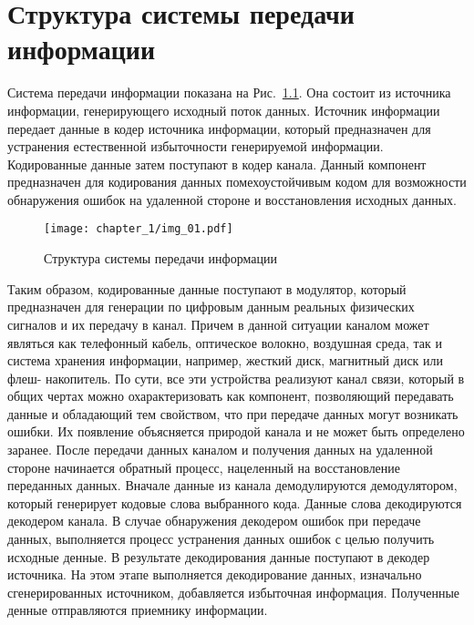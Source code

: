 \chapter{Структура системы передачи информации}

Система передачи информации показана на Рис.~\ref{img_01}. Она состоит из источника информации, генерирующего исходный 
поток данных. Источник информации передает данные в кодер источника информации, который предназначен для устранения 
естественной избыточности генерируемой информации. Кодированные данные затем поступают в кодер канала. Данный 
компонент предназначен для кодирования данных помехоустойчивым кодом для возможности обнаружения ошибок на удаленной 
стороне и восстановления исходных данных.

\begin{figure}[htbp]
\begin{center}
\texttt{[image: chapter\_1/img\_01.pdf]}
\end{center}
\caption{Структура системы передачи информации}
\label{img_01}
\end{figure}

Таким образом, кодированные данные поступают в модулятор, который предназначен для генерации по цифровым данным реальных физических сигналов и их передачу в канал. Причем в данной ситуации каналом может являться как телефонный кабель, оптическое волокно, воздушная среда, так и система хранения информации, например, жесткий диск, магнитный диск или флеш- накопитель. По сути, все эти устройства реализуют канал связи, который в общих чертах можно охарактеризовать как компонент, позволяющий передавать данные и обладающий тем свойством, что при передаче данных могут возникать ошибки. Их появление объясняется природой канала и не может быть определено заранее. После передачи данных каналом и получения данных на удаленной стороне начинается обратный процесс, нацеленный на восстановление переданных данных. Вначале данные из канала демодулируются демодулятором, который генерирует кодовые слова выбранного кода. Данные слова декодируются декодером канала. В случае обнаружения декодером ошибок при передаче данных, выполняется процесс устранения данных ошибок с целью получить исходные денные. В результате декодирования данные поступают в декодер источника. На этом этапе выполняется декодирование данных, изначально сгенерированных источником, добавляется избыточная информация. Полученные денные отправляются приемнику информации.
